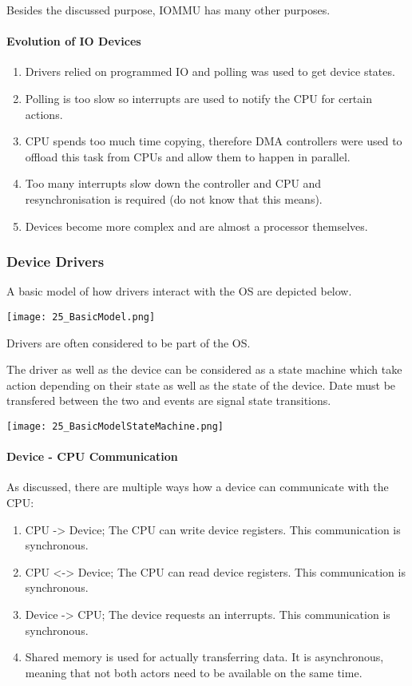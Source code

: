 Besides the discussed purpose, IOMMU has many other purposes.

\paragraph{Evolution of IO Devices}
\begin{enumerate}
    \item Drivers relied on programmed IO and polling was used to get device states.
    \item Polling is too slow so interrupts are used to notify the CPU for certain actions.
    \item CPU spends too much time copying, therefore DMA controllers were used to offload this task from CPUs and allow them to happen in parallel.
    \item Too many interrupts slow down the controller and CPU and resynchronisation is required (do not know that this means).
    \item Devices become more complex and are almost a processor themselves.
\end{enumerate}


\subsubsection{Device Drivers}
A basic model of how drivers interact with the OS are depicted below.

\texttt{[image: 25\_BasicModel.png]}

Drivers are often considered to be part of the OS.

The driver as well as the device can be considered as a state machine which take action depending on their state as well as the state of the device. Date must be transfered between the two and events are signal state transitions.

\texttt{[image: 25\_BasicModelStateMachine.png]}

\paragraph{Device - CPU Communication}
As discussed, there are multiple ways how a device can communicate with the CPU:

\begin{enumerate}
    \item CPU -> Device; The CPU can write device registers. This communication is synchronous.
    \item CPU <-> Device; The CPU can read device registers. This communication is synchronous.
    \item Device -> CPU; The device requests an interrupts. This communication is synchronous.
    \item Shared memory is used for actually transferring data. It is asynchronous, meaning that not both actors need to be available on the same time.
\end{enumerate}


